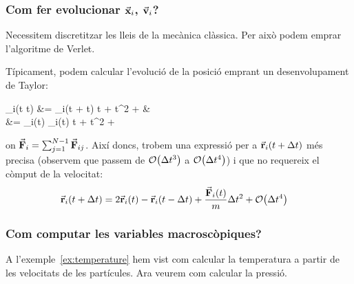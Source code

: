 \subsubsection*{Com fer evolucionar $\va{x}_{i}$, $\va{v}_{i}$?}
Necessitem discretitzar les lleis de la mecànica clàssica. Per això podem emprar l'algoritme de Verlet.

\begin{meth}\label{meth:algoritme-verlet}
	Típicament, podem calcular l'evolució de la posició emprant un desenvolupament de Taylor:
	\begin{flalign*}
		_{i}(t \pm \Delta t) &= _{i}(t + \Delta t) \pm {} \Delta t +  \Delta t^{2} +  & \\
		&= _{i}(t) \pm {}_{i}(t) \Delta t +  \Delta t^{2} + 
	\end{flalign*}
	on $\va{F}_{i} = \sum_{j=1}^{N-1} \va{F}_{ij}$.
	Així doncs, trobem una expressió per a $\va{r}_{i}(t + \Delta t)$ més precisa (observem que passem de $\order{\Delta t^{3}}$ a $\order{\Delta t^{4}}$) i que no requereix el còmput de la velocitat:
	\begin{align}
		\va{r}_{i}(t + \Delta t) = 2 \va{r}_{i}(t) - \va{r}_{i}(t - \Delta t) + \frac{\va{F}_{i}(t)}{m} \Delta t^{2} + \order{\Delta t^{4}} &
	\end{align}
\end{meth}

\subsubsection*{Com computar les variables macroscòpiques?}
A l'exemple~\ref{ex:temperature} hem vist com calcular la temperatura a partir de les velocitats de les partícules. Ara veurem com calcular la pressió.

